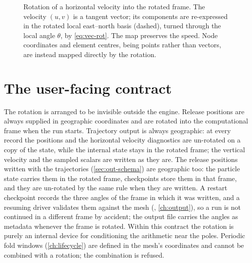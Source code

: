 \begin{figure}[t]
\centering
{}
\caption{Rotation of a horizontal velocity into the rotated frame. The velocity $(u,v)$ is a tangent
vector; its components are re-expressed in the rotated local east--north basis (dashed), turned through
the local angle $\theta$, by \cref{eq:vec-rot}. The map preserves the speed. Node coordinates and element
centres, being points rather than vectors, are instead mapped directly by the rotation.}
\label{fig:rotation}
\end{figure}

\section{The user-facing contract}\label{sec:frame-contract}

The rotation is arranged to be invisible outside the engine. Release positions are always supplied in
geographic coordinates and are rotated into the computational frame when the run starts. Trajectory
output is always geographic: at every record the positions and the horizontal velocity diagnostics are
un-rotated on a copy of the state, while the internal state stays in the rotated frame; the vertical
velocity and the sampled scalars are written as they are. The release positions written with the
trajectories (\cref{sec:out-schema}) are geographic too: the particle state carries them in the rotated
frame, checkpoints store them in that frame, and they are un-rotated by the same rule when they are
written. A restart checkpoint records the three angles
of the frame in which it was written, and a resuming driver validates them against the mesh
(, \cref{ch:output}), so a run is not continued in a different frame by
accident; the output file carries the angles as metadata whenever
the frame is rotated. Within this contract the rotation is purely an internal device for conditioning
the arithmetic near the poles. Periodic fold windows (\cref{ch:lifecycle}) are defined in the mesh's
coordinates and cannot be combined with a rotation; the combination is refused.

